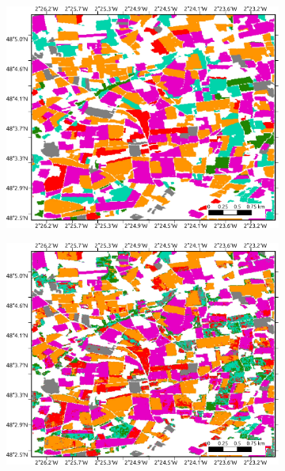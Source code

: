 \documentclass[journal,article,submit,pdftex,moreauthors]{Definitions/mdpi}
\begin{document}
\begin{figure}[H]
	\begin{subfigure}[t]{0.28\linewidth}
	\includegraphics[height=\linewidth,width=\textwidth]{figures/aes_1_layer_mse_results/gt_with_format_v2.pdf}
	\caption{}
	\label{fig:frh04_labels}
	\end{subfigure}%
	\begin{subfigure}[t]{0.28\linewidth}
	  \includegraphics[height=\linewidth,width=\textwidth]{figures/aes_1_layer_mse_results/prediction_pixel_based_format_v2.pdf}

\end{subfigure}
\end{figure}
\end{document}
